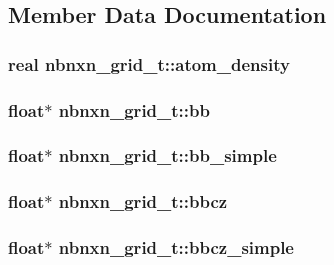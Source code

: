 \subsection{\-Member \-Data \-Documentation}
\hypertarget{structnbnxn__grid__t_a5b70775b3771d908938bb2cebae754f9}{
\subsubsection[{atom\-\_\-density}]{\setlength{\rightskip}{0pt plus 5cm}real {\bf nbnxn\-\_\-grid\-\_\-t\-::atom\-\_\-density}}}\label{structnbnxn__grid__t_a5b70775b3771d908938bb2cebae754f9}
\hypertarget{structnbnxn__grid__t_a1ed682e1e3b8362777fd7134c9d78ea4}{
\subsubsection[{bb}]{\setlength{\rightskip}{0pt plus 5cm}float$\ast$ {\bf nbnxn\-\_\-grid\-\_\-t\-::bb}}}\label{structnbnxn__grid__t_a1ed682e1e3b8362777fd7134c9d78ea4}
\hypertarget{structnbnxn__grid__t_a5ad792621e5d8bcc2c3e3145f7d09c1d}{
\subsubsection[{bb\-\_\-simple}]{\setlength{\rightskip}{0pt plus 5cm}float$\ast$ {\bf nbnxn\-\_\-grid\-\_\-t\-::bb\-\_\-simple}}}\label{structnbnxn__grid__t_a5ad792621e5d8bcc2c3e3145f7d09c1d}
\hypertarget{structnbnxn__grid__t_a86937697caf40f19c1e2a5c9e0aac826}{
\subsubsection[{bbcz}]{\setlength{\rightskip}{0pt plus 5cm}float$\ast$ {\bf nbnxn\-\_\-grid\-\_\-t\-::bbcz}}}\label{structnbnxn__grid__t_a86937697caf40f19c1e2a5c9e0aac826}
\hypertarget{structnbnxn__grid__t_af8346fa8658b0756513f2a0af632b2c3}{
\subsubsection[{bbcz\-\_\-simple}]{\setlength{\rightskip}{0pt plus 5cm}float$\ast$ {\bf nbnxn\-\_\-grid\-\_\-t\-::bbcz\-\_\-simple}}}\label{structnbnxn__grid__t_af8346fa8658b0756513f2a0af632b2c3}
